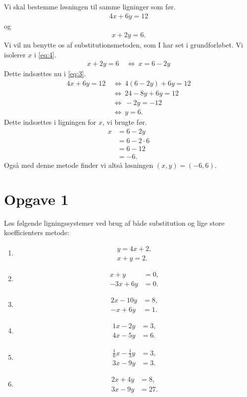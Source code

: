 \begin{exa}[Substitutionsmetoden]
	Vi skal bestemme løsningen til samme ligninger som før.
		\begin{align}\label{eq:3}
		4x+6y = 12
	\end{align}
	og 
	\begin{align}\label{eq:4}
		x+2y=6.
	\end{align}
	Vi vil nu benytte os af substitutionsmetoden, som I har set i grundforløbet. 
	Vi isolerer $x$ i \eqref{eq:4}.
	\begin{align*}
		x+2y = 6 \ &\Leftrightarrow \ x = 6-2y 
	\end{align*}
	Dette indsættes nu i \eqref{eq:3}.
	\begin{align*}
		4x+6y = 12 \ &\Leftrightarrow \ 4(6-2y)+6y = 12	\\
		&\Leftrightarrow \ 24-8y+6y = 12\\
		&\Leftrightarrow	\ -2y = -12\\
		&\Leftrightarrow	\ y = 6.
	\end{align*}
	Dette indsættes i ligningen for $x$, vi brugte før.
	\begin{align*}
		x&= 6-2y\\
		&=6-2 \cdot 6\\
		&=6-12\\
		&= -6.
	\end{align*}
	Også med denne metode finder vi altså løsningen $(x,y) = (-6,6)$. 
\end{exa}

\section*{Opgave 1}
Løs følgende ligningssystemer ved brug af både substitution og lige store koefficienters metode:
\begin{enumerate}[label=\roman*)]
	\item 
	\begin{align*}
		y = 4x+2,\\
		x+y=2.		
	\end{align*}
\item \begin{align*}
x+y&=0,\\
-3x+6y&=0.
\end{align*}
\item 
\begin{align*}
2x-10y&=8,\\
-x+6y&=1.
\end{align*}
\item
\begin{align*}
1x-2y&=3,\\
4x-5y&=6.
\end{align*}
\item
\begin{align*}
\frac{1}{6}x-\frac{1}{3}y&=3,\\
3x-9y&=3.
\end{align*}
\item 
\begin{align*}
2x+4y&=8,\\
3x-9y&=27.
\end{align*}
\end{enumerate}

